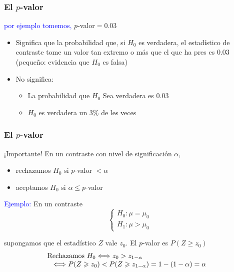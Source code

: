\documentclass[12pt,t]{beamer}\usepackage[]{graphicx}\usepackage[]{color}
\newcommand{\blue}[1]{\textcolor{blue}{#1}}
\renewcommand{\emph}[1]{{\color{red}#1}}
\renewcommand{\leq}{\leqslant}
\renewcommand{\geq}{\geqslant}
\theoremstyle{plain}
\theoremstyle{definition}
\begin{document}
\begin{frame}
\frametitle{El $p$-valor}

\blue{por ejemplo tomemos,} $p$-valor${} =0.03$ 
\medskip

\begin{itemize}
\item \emph{Significa} que la probabilidad que, si $H_0$ es verdadera, el estadístico de contraste tome un valor tan extremo o más que el que ha pres  es 0.03 (pequeño: evidencia que $H_0$ es falsa)
\medskip

\item \emph{No significa}:
\medskip

\begin{itemize}
\item La probabilidad que $H_0$ Sea verdadera   es $0.03$
\medskip

\item  $H_0$ es verdadera   un 3\% de les veces
\end{itemize}
\end{itemize}
\end{frame}






\begin{frame}
\frametitle{El $p$-valor}
\vspace*{-3ex}

\begin{block}{¡Importante!}
En un contraste con nivel de significación   $\alpha$, 
\begin{itemize}
\item rechazamos $H_0$ si $p$-valor $<\alpha$

\item aceptamos $H_0$ si $\alpha\leq p$-valor
\end{itemize}
\end{block}
\medskip

\blue{Ejemplo:} En un contraste
$$
\left\{\begin{array}{l}
H_{0}:\mu=\mu_{0}\\ H_{1}:\mu> \mu_{0}
\end{array}
\right.
$$

supongamos  que el estadístico $Z$ vale $z_0$. El $p$-valor es $P(Z \geq z_0)$
$$
\begin{array}{l}
\hspace*{-2ex}\mbox{Rechazamos }  H_0  \Longleftrightarrow z_0>z_{1-\alpha}\\
 \Longleftrightarrow P(Z \geq z_0)<P(Z\geq z_{1-\alpha})=1-(1-\alpha)=\alpha
\end{array}
$$
\end{frame}
\end{document}
